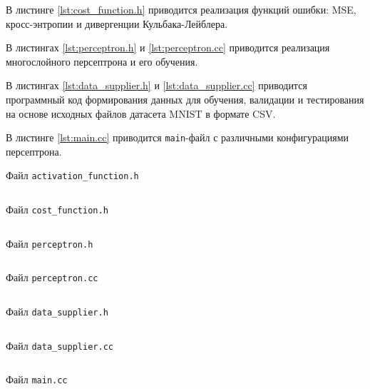 \documentclass[a4paper, 14pt]{extarticle}
\newenvironment{longlisting}{\captionsetup{type=listing}}{}
\begin{document}
В листинге \ref{lst:cost_function.h} приводится реализация функций ошибки: MSE, кросс-энтропии и дивергенции Кульбака-Лейблера.

В листингах \ref{lst:perceptron.h} и \ref{lst:perceptron.cc} приводится реализация многослойного персептрона и его обучения.

В листингах \ref{lst:data_supplier.h} и \ref{lst:data_supplier.cc} приводится программный код формирования данных для обучения, валидации и
тестирования на основе исходных файлов датасета MNIST в формате CSV.

В листинге \ref{lst:main.cc} приводится \texttt{main}-файл с различными конфигурациями персептрона.
 
\begin{longlisting}
  \caption{Файл \texttt{activation\_function.h}}
  \inputminted{cpp}{../src/activation_function.h}
  \label{lst:activation_function.h}
\end{longlisting}

\begin{longlisting}
  \caption{Файл \texttt{cost\_function.h}}
  \inputminted{cpp}{../src/cost_function.h}
  \label{lst:cost_function.h}
\end{longlisting}

\begin{longlisting}
  \caption{Файл \texttt{perceptron.h}}
  \inputminted{cpp}{../src/perceptron.h}
  \label{lst:perceptron.h}
\end{longlisting}

\begin{longlisting}
  \caption{Файл \texttt{perceptron.cc}}
  \inputminted{cpp}{../src/perceptron.cc}
  \label{lst:perceptron.cc}
\end{longlisting}

\begin{longlisting}
  \caption{Файл \texttt{data\_supplier.h}}
  \inputminted{cpp}{../src/data_supplier.h}
  \label{lst:data_supplier.h}
\end{longlisting}

\begin{longlisting}
  \caption{Файл \texttt{data\_supplier.cc}}
  \inputminted{cpp}{../src/data_supplier.cc}
  \label{lst:data_supplier.cc}
\end{longlisting}

\begin{longlisting}
  \caption{Файл \texttt{main.cc}}
  \inputminted{cpp}{../src/main.cc}
  \label{lst:main.cc}
\end{longlisting}
\end{document}
